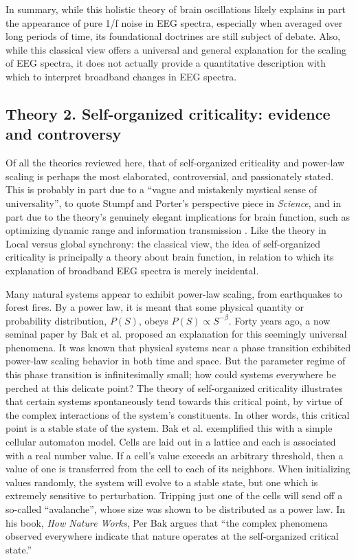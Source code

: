 In summary, while this holistic theory of brain oscillations likely explains in part the appearance of pure 1/f noise in EEG spectra, especially when averaged over long periods of time, its foundational doctrines are still subject of debate. Also, while this classical view offers a universal and general explanation for the scaling of EEG spectra, it does not actually provide a quantitative description with which to interpret broadband changes in EEG spectra. 

\subsection{Theory 2. Self-organized criticality: evidence and controversy} \label{sec:SOC}
Of all the theories reviewed here, that of self-organized criticality and power-law scaling is perhaps the most elaborated, controversial, and passionately stated. This is probably in part due to a ``vague and mistakenly mystical sense of universality'', to quote Stumpf and Porter’s perspective piece in \textit{Science}\cite{Stumpf2012}, and in part due to the theory’s genuinely elegant implications for brain function, such as optimizing dynamic range \cite{Kinouchi2006} and information transmission \cite{Shriki2016}. Like the theory in Local versus global synchrony: the classical view, the idea of self-organized criticality is principally a theory about brain function, in relation to which its explanation of broadband EEG spectra is merely incidental.  

Many natural systems appear to exhibit power-law scaling, from earthquakes to forest fires. By a power law, it is meant that some physical quantity or probability distribution, $P(S)$, obeys $P(S)\propto S^{-\beta}$. Forty years ago, a now seminal paper by Bak et al. \cite{Bak1987} proposed an explanation for this seemingly universal phenomena. It was known that physical systems near a phase transition exhibited power-law scaling behavior in both time and space. But the parameter regime of this phase transition is infinitesimally small; how could systems everywhere be perched at this delicate point? The theory of self-organized criticality illustrates that certain systems spontaneously tend towards this critical point, by virtue of the complex interactions of the system’s constituents. In other words, this critical point is a stable state of the system. Bak et al. exemplified this with a simple cellular automaton model. Cells are laid out in a lattice and each is associated with a real number value. If a cell’s value exceeds an arbitrary threshold, then a value of one is transferred from the cell to each of its neighbors. When initializing values randomly, the system will evolve to a stable state, but one which is extremely sensitive to perturbation. Tripping just one of the cells will send off a so-called “avalanche”, whose size was shown to be distributed as a power law. In his book, \textit{How Nature Works}\cite{Bak1996}, Per Bak argues that “the complex phenomena observed everywhere indicate that nature operates at the self-organized critical state.”

